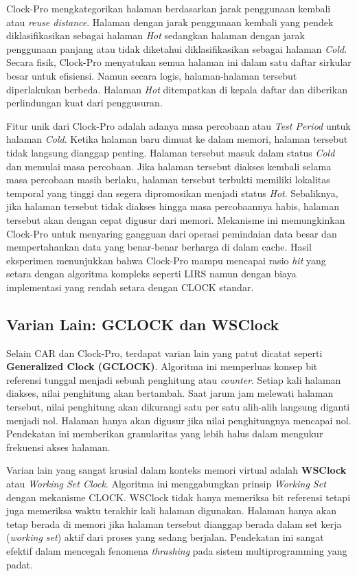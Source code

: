 Clock-Pro mengkategorikan halaman berdasarkan jarak penggunaan
kembali atau \textit{reuse distance}.
Halaman dengan jarak penggunaan kembali yang pendek diklasifikasikan
sebagai halaman \textit{Hot} sedangkan halaman dengan jarak
penggunaan panjang atau tidak diketahui diklasifikasikan sebagai
halaman \textit{Cold}.
Secara fisik, Clock-Pro menyatukan semua halaman ini dalam satu
daftar sirkular besar untuk efisiensi.
Namun secara logis, halaman-halaman tersebut diperlakukan berbeda.
Halaman \textit{Hot} ditempatkan di kepala daftar dan diberikan
perlindungan kuat dari penggusuran.

Fitur unik dari Clock-Pro adalah adanya masa percobaan atau
\textit{Test Period} untuk halaman \textit{Cold}.
Ketika halaman baru dimuat ke dalam memori, halaman tersebut tidak
langsung dianggap penting.
Halaman tersebut masuk dalam status \textit{Cold} dan memulai masa percobaan.
Jika halaman tersebut diakses kembali selama masa percobaan masih
berlaku, halaman tersebut terbukti memiliki lokalitas temporal yang
tinggi dan segera dipromosikan menjadi status \textit{Hot}.
Sebaliknya, jika halaman tersebut tidak diakses hingga masa
percobaannya habis, halaman tersebut akan dengan cepat digusur dari memori.
Mekanisme ini memungkinkan Clock-Pro untuk menyaring gangguan dari
operasi pemindaian data besar dan mempertahankan data yang
benar-benar berharga di dalam cache.
Hasil eksperimen menunjukkan bahwa Clock-Pro mampu mencapai rasio
\textit{hit} yang setara dengan algoritma kompleks seperti LIRS namun
dengan biaya implementasi yang rendah setara dengan CLOCK standar.

\subsection{Varian Lain: GCLOCK dan WSClock}
Selain CAR dan Clock-Pro, terdapat varian lain yang patut dicatat
seperti \textbf{Generalized Clock (GCLOCK)}.
Algoritma ini memperluas konsep bit referensi tunggal menjadi sebuah
penghitung atau \textit{counter}.
Setiap kali halaman diakses, nilai penghitung akan bertambah.
Saat jarum jam melewati halaman tersebut, nilai penghitung akan
dikurangi satu per satu alih-alih langsung diganti menjadi nol.
Halaman hanya akan digusur jika nilai penghitungnya mencapai nol.
Pendekatan ini memberikan granularitas yang lebih halus dalam
mengukur frekuensi akses halaman.

Varian lain yang sangat krusial dalam konteks memori virtual adalah
\textbf{WSClock} atau \textit{Working Set Clock}.
Algoritma ini menggabungkan prinsip \textit{Working Set} dengan mekanisme CLOCK.
WSClock tidak hanya memeriksa bit referensi tetapi juga memeriksa
waktu terakhir kali halaman digunakan.
Halaman hanya akan tetap berada di memori jika halaman tersebut
dianggap berada dalam set kerja (\textit{working set}) aktif dari
proses yang sedang berjalan.
Pendekatan ini sangat efektif dalam mencegah fenomena
\textit{thrashing} pada sistem multiprogramming yang padat.

